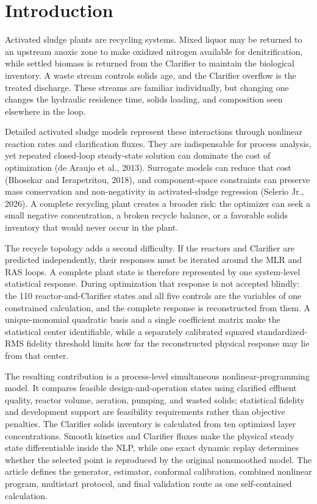 \documentclass[a4paper,fleqn]{cas-sc}
\begin{document}
\section{Introduction}
Activated sludge plants are recycling systems. Mixed liquor may be returned to an upstream anoxic zone to make oxidized nitrogen available for denitrification, while settled biomass is returned from the Clarifier to maintain the biological inventory. A waste stream controls solids age, and the Clarifier overflow is the treated discharge. These streams are familiar individually, but changing one changes the hydraulic residence time, solids loading, and composition seen elsewhere in the loop.

Detailed activated sludge models represent these interactions through nonlinear reaction rates and clarification fluxes. They are indispensable for process analysis, yet repeated closed-loop steady-state solution can dominate the cost of optimization (de Araujo et al., 2013). Surrogate models can reduce that cost (Bhosekar and Ierapetritou, 2018), and component-space constraints can preserve mass conservation and non-negativity in activated-sludge regression (Selerio Jr., 2026). A complete recycling plant creates a broader risk: the optimizer can seek a small negative concentration, a broken recycle balance, or a favorable solids inventory that would never occur in the plant.

The recycle topology adds a second difficulty. If the reactors and Clarifier are predicted independently, their responses must be iterated around the MLR and RAS loops. A complete plant state is therefore represented by one system-level statistical response. During optimization that response is not accepted blindly: the 110 reactor-and-Clarifier states and all five controls are the variables of one constrained calculation, and the complete response is reconstructed from them. A unique-monomial quadratic basis and a single coefficient matrix make the statistical center identifiable, while a separately calibrated squared standardized-RMS fidelity threshold limits how far the reconstructed physical response may lie from that center.

The resulting contribution is a process-level simultaneous nonlinear-programming model. It compares feasible design-and-operation states using clarified effluent quality, reactor volume, aeration, pumping, and wasted solids; statistical fidelity and development support are feasibility requirements rather than objective penalties. The Clarifier solids inventory is calculated from ten optimized layer concentrations. Smooth kinetics and Clarifier fluxes make the physical steady state differentiable inside the NLP, while one exact dynamic replay determines whether the selected point is reproduced by the original nonsmoothed model. The article defines the generator, estimator, conformal calibration, combined nonlinear program, multistart protocol, and final validation route as one self-contained calculation.
\end{document}
